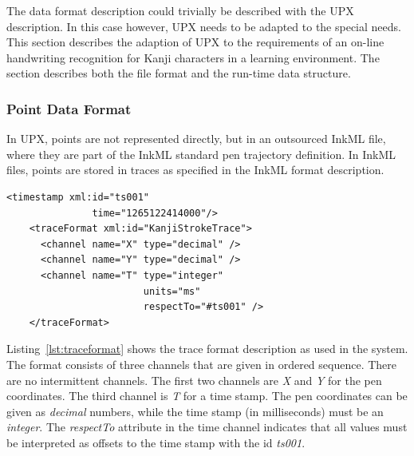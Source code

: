
The data format description could trivially be described with the UPX 
description. In this case however, UPX needs to be adapted to the special needs.
This section describes the adaption of UPX to the requirements of an on-line
handwriting recognition for Kanji characters in a learning environment.
The section describes both the file format and the run-time data structure.

\subsubsection{Point Data Format}
\label{sec:hwre:pointdataformat}

In UPX, points are not represented directly, but in an outsourced InkML file,
where they are part of the InkML standard pen trajectory definition. In InkML
files, points are stored in traces as specified in the InkML format description.
\begin{xmlcode}
  \begin{lstlisting}[emph={traceFormat,channel,timestamp},
                     emphstyle=\color{blue}\textbf,
                     emph={[2]name,type,units,respectTo,id,time},
                     emphstyle={[2]\color{red}},
                     caption={Definition of the trace format},
                     label=lst:traceformat]
    <timestamp xml:id="ts001" 
               time="1265122414000"/>
    <traceFormat xml:id="KanjiStrokeTrace">
      <channel name="X" type="decimal" />
      <channel name="Y" type="decimal" />
      <channel name="T" type="integer"
                        units="ms"
                        respectTo="#ts001" />
    </traceFormat>
  \end{lstlisting}
\end{xmlcode}
Listing~\ref{lst:traceformat} shows the trace format description as used in
the system. The format consists of three channels that are given in ordered 
sequence. There are no intermittent channels. The first two channels are \emph{X}
and \emph{Y} for the pen coordinates. The third channel is \emph{T} for a time 
stamp. The pen coordinates can be given as \emph{decimal} numbers, while the
time stamp (in milliseconds) must be an \emph{integer}.
The \emph{respectTo} attribute in the time channel indicates that all values
must be interpreted as offsets to the time stamp with the id \emph{ts001}.

